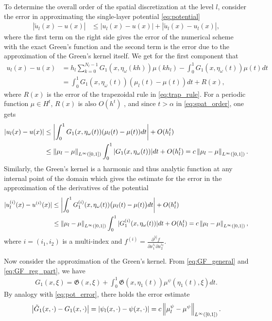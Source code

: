 To determine the overall order of the spatial discretization at the level $l$, consider the error in approximating the single-layer potential \eqref{eq:potential}
 \begin{align*}
|\tilde{u}_l(x) - u(x)|
&\leq |u_l(x) - u(x)| + |\tilde{u}_l(x) - u_l(x)|,
\end{align*}
where the first term on the right side gives the error of the numerical scheme with the exact Green's function and the second term is the error due to the approximation of the Green's kernel itself.
We get for the first component that
\begin{align*}
u_l(x) - u(x)
&= h_l \sum_{k=0}^{N_l-1} G_1(x,\eta_{\omega}(kh)) \mu(kh_l) - \int_0^1 G_1(x,\eta_{\omega}(t)) \mu(t) dt
\\ \nonumber
&=  \int_0^1 G_1(x,\eta_{\omega}(t)) ( \mu_l(t) - \mu(t) ) dt  +  R(x),
\end{align*}
where $R(x)$ is the error of the trapezoidal rule in \eqref{eq:trap_rule}.
For a periodic function $\mu\in H^t$, $R(x)$ is also $O(h^t)$ \cite[Lemma~A1]{Sloan1992}, and since $t>\alpha$ in \eqref{eq:spat_order}, one gets
\begin{align}\label{eq:pot_error}
| u_l(x) - u(x) |
&\leq \left| \int_0^1 G_1(x,\eta_{\omega}(t)) ( \mu_l(t) - \mu(t) ) dt \right| + O(h_l^t)
\\ \nonumber
&\leq
\left\| \mu_l-\mu \right\|_{L^{\infty}([0,1])} \int_0^1 | G_1(x,\eta_{\omega}(t)) |  dt + O(h_l^t)
= c \left\| \mu_l-\mu \right\|_{L^{\infty}([0,1])}.
\end{align}
Similarly, the Green's kernel is a harmonic and thus analytic function at any internal point of the domain which gives the estimate for the error in the approximation of the derivatives of the potential
\begin{align}\label{eq:pot_deriv_error}
| u_l^{(i)}(x) - u^{(i)}(x) |
&\leq \left| \int_0^1 G_1^{(i)}(x,\eta_{\omega}(t)) \big( \mu_l(t) - \mu(t) \big) dt \right| + O(h_l^t)
\\ \nonumber
&\leq \left\| \mu_l-\mu \right\|_{L^{\infty}([0,1])} \int_0^1 |  G_1^{(i)}(x,\eta_{\omega}(t)) |  dt + O(h_l^t)
= c \left\| \mu_l-\mu \right\|_{L^{\infty}([0,1])},
\end{align}
where $i=(i_1, i_2)$ is a multi-index and $f^{(i)} = \displaystyle{ \frac{\partial^{|i|} f}{\partial x_1^{i_1} \partial x_2^{i_2}} }$.


Now consider the approximation of the Green's kernel.
From \eqref{eq:GF_general} and \eqref{eq:GF_reg_part}, we have 
\begin{align*}
	G_1(x,\xi) = \mathfrak{G}(x,\xi) +  \int_0^1 \mathfrak{G}(x,\eta_{1}(t)) \mu^{\psi}(\eta_{1}(t),\xi) dt.
\end{align*}
By analogy with \eqref{eq:pot_error}, there holds the error estimate
\begin{align}\label{eq:GF_error}
\left| \tilde{G}_1(x,\cdot) - G_1(x,\cdot) \right|
= \left| \psi_{l}(x,\cdot) - \psi(x,\cdot) \right|
= c \left\| \mu_{l}^{\psi}-\mu^{\psi} \right\|_{L^{\infty}([0,1])}.
\end{align}

